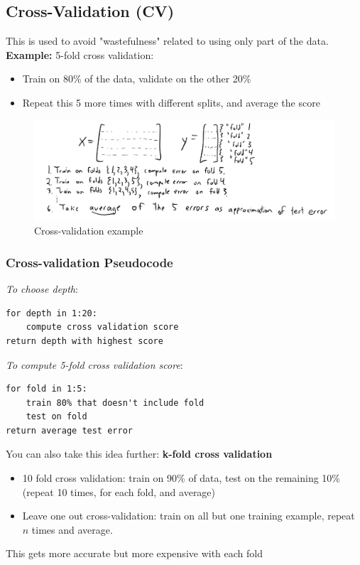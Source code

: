 \documentclass{article}
\theoremstyle{definition}
\begin{document}
\subsection*{Cross-Validation (CV)}
This is used to avoid "wastefulness" related to using only part of the data. \\
\textbf{Example:} 5-fold cross validation:
 \begin{itemize}
 	\item Train on 80\% of the data, validate on the other 20\%
 	\item Repeat this 5 more times with different splits, and average the score
 \end{itemize}

\begin{figure}[H]
	\centering
	\includegraphics[width = 6in]{Pic11}
	\caption{Cross-validation example}
\end{figure}

\subsubsection*{Cross-validation Pseudocode}
\textsl{To choose depth}:
\begin{lstlisting}[tabsize=3]
for depth in 1:20:
	compute cross validation score
return depth with highest score
\end{lstlisting}
\textsl{To compute 5-fold cross validation score}:
\begin{lstlisting}[tabsize=3]
for fold in 1:5:
	train 80% that doesn't include fold
	test on fold
return average test error
\end{lstlisting}
You can also take this idea further: \textbf{k-fold cross validation}
\begin{itemize}
	\item {\color{blue} 10 fold cross validation}: train on 90\% of data, test on the remaining 10\% (repeat 10 times, for each fold, and average)
	\item {\color{blue} Leave one out cross-validation}: train on all but one training example, repeat $ n $ times and average.
\end{itemize}
This gets {\color{OliveGreen} more accurate} but {\color{red} more expensive} with each fold
\end{document}
